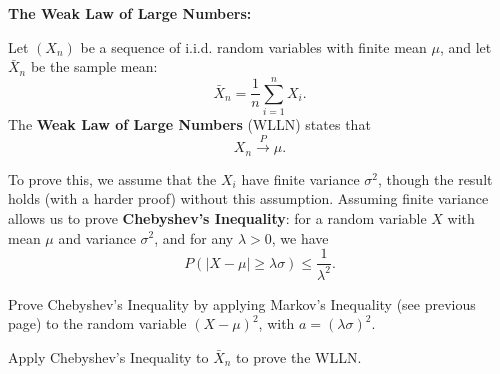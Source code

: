 \documentclass{article}
\begin{document}
\clearpage






\textbf{The Weak Law of Large Numbers:}\bigskip

Let $(X_n)$ be a sequence of i.i.d. random variables with finite mean $\mu$, and let $\bar{X}_n$ be the sample mean:
\[\bar{X}_n=\frac{1}{n}\sum_{i=1}^n X_i.\]
The \textbf{Weak Law of Large Numbers} (WLLN) states that
\[X_n\xrightarrow{P}\mu.\]
\vfill

To prove this, we assume that the $X_i$ have finite variance $\sigma^2$, though the result holds (with a harder proof) without this assumption. Assuming finite variance allows us to prove \textbf{Chebyshev's Inequality}: for a random variable $X$ with mean $\mu$ and variance $\sigma^2$, and for any $\lambda>0$, we have
\[P(|X-\mu|\geq\lambda\sigma)\leq \frac{1}{\lambda^2}.\]

Prove Chebyshev's Inequality by applying Markov's Inequality (see previous page) to the random variable $(X-\mu)^2$, with $a=(\lambda\sigma)^2$.

\vfill

Apply Chebyshev's Inequality to $\bar{X}_n$ to prove the WLLN.

\vfill
\end{document}
